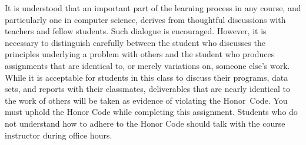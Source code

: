 \documentclass[11pt]{article}
\begin{document}
It is understood that an important part of the learning process in any course,
and particularly one in computer science, derives from thoughtful discussions
with teachers and fellow students. Such dialogue is encouraged. However, it is
necessary to distinguish carefully between the student who discusses the
principles underlying a problem with others and the student who produces
assignments that are identical to, or merely variations on, someone else's work.
While it is acceptable for students in this class to discuss their programs,
data sets, and reports with their classmates, deliverables that are nearly
identical to the work of others will be taken as evidence of violating the
\mbox{Honor Code}. You must uphold the Honor Code while completing this
assignment. Students who do not understand how to adhere to the Honor Code
should talk with the course instructor during office hours.


\end{document}
